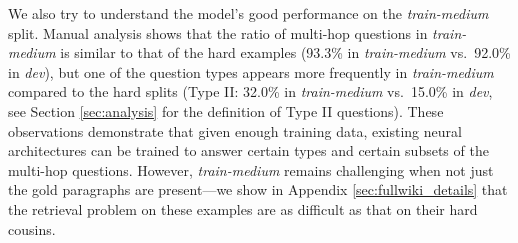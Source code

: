 

We also try to understand the model's good performance on the \textit{train-medium} split.
Manual analysis shows that the ratio of multi-hop questions in \textit{train-medium} is similar to that of the hard examples (93.3\% in \textit{train-medium} vs.\ 92.0\% in \textit{dev}), but one of the question types appears more frequently in \textit{train-medium} compared to the hard splits (Type II: 32.0\% in \textit{train-medium} vs.\ 15.0\% in \textit{dev}, see Section \ref{sec:analysis} for the definition of Type II questions).
These observations demonstrate that given enough training data, existing neural architectures can be trained to answer certain types and certain subsets of the multi-hop questions.
However, \textit{train-medium} remains challenging when not just the gold paragraphs are present---we show in Appendix \ref{sec:fullwiki_details} that the retrieval problem on these examples are as difficult as that on their hard cousins.

